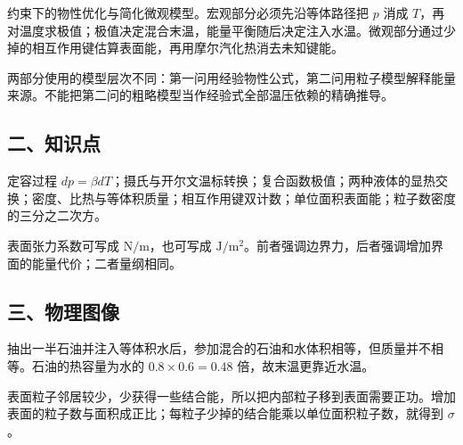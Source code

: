 \documentclass[12pt,a4paper,fontset=fandol]{ctexart}
\begin{document}
约束下的物性优化与简化微观模型。宏观部分必须先沿等体路径把 \(p\) 消成
\(T\)，再对温度求极值；极值决定混合末温，能量平衡随后决定注入水温。微观部分通过少掉的相互作用键估算表面能，再用摩尔汽化热消去未知键能。

两部分使用的模型层次不同：第一问用经验物性公式，第二问用粒子模型解释能量来源。不能把第二问的粗略模型当作经验式全部温压依赖的精确推导。

\subsection{二、知识点}\label{ux4e8cux77e5ux8bc6ux70b9-2}

定容过程
\(dp=\beta dT\)；摄氏与开尔文温标转换；复合函数极值；两种液体的显热交换；密度、比热与等体积质量；相互作用键双计数；单位面积表面能；粒子数密度的三分之二次方。

表面张力系数可写成 \(\mathrm{N/m}\)，也可写成
\(\mathrm{J/m^2}\)。前者强调边界力，后者强调增加界面的能量代价；二者量纲相同。

\subsection{三、物理图像}\label{ux4e09ux7269ux7406ux56feux50cf-2}

抽出一半石油并注入等体积水后，参加混合的石油和水体积相等，但质量并不相等。石油的热容量为水的
\(0.8\times0.6=0.48\) 倍，故末温更靠近水温。

表面粒子邻居较少，少获得一些结合能，所以把内部粒子移到表面需要正功。增加表面的粒子数与面积成正比；每粒子少掉的结合能乘以单位面积粒子数，就得到
\(\sigma\)。

\begin{center}
\begin{minipage}{\linewidth}
\centering\begingroup
{}
\ifdim\wd\diagrambox>.88\linewidth
\sbox{\diagrambox}{\resizebox{.88\linewidth}{!}{\usebox{\diagrambox}}}
\fi
\ifdim\ht\diagrambox>.40\textheight
\resizebox{!}{.40\textheight}{\usebox{\diagrambox}}
\else\usebox{\diagrambox}\fi
\par{}
\endgroup\end{minipage}
\end{center}
\end{document}
